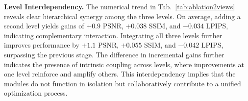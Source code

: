 \begin{table}[t]
\centering
\setlength{\tabcolsep}{4pt}
\caption{\textbf{Ablation study on level interdependencies} on LLFF dataset for 2 training views.}
\label{tab:ablation2views}
\vspace{-5pt}
\end{table}

\textbf{Level Interdependency.}
The numerical trend in Tab.~\ref{tab:ablation2views} reveals clear hierarchical synergy among the three levels.
On average, adding a second level yields gains of $+0.9$ PSNR, $+0.038$ SSIM, and $-0.034$ LPIPS, indicating complementary interaction.
Integrating all three levels further improves performance by $+1.1$ PSNR, $+0.055$ SSIM, and $-0.042$ LPIPS, surpassing the previous stage.
The difference in incremental gains further indicates the presence of intrinsic coupling across levels, where improvements at one level reinforce and amplify others. This interdependency implies that the modules do not function in isolation but collaboratively contribute to a unified optimization process.

